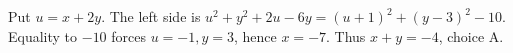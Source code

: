 Put $u=x+2y$. The left side is $u^2+y^2+2u-6y=(u+1)^2+(y-3)^2-10$. Equality to $-10$ forces $u=-1,y=3$, hence $x=-7$. Thus $\boxed{x+y=-4}$, choice A.
